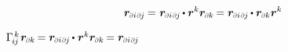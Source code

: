\begin{otherlanguage}{russian}
\vspace{1.2em}\begin{equation*}
\locationvector_{\differentialindex{i}\hspace{.2ex}\differentialindex{\hspace{-0.1ex}j}} \hspace{-0.1ex} = \hspace{.1ex}
\tikzmark{beginChristoffelSymbolOne} \locationvector_{\differentialindex{i}\hspace{.2ex}\differentialindex{\hspace{-0.1ex}j}} \hspace{-0.15ex} \dotp \tikzmark{beginEtensorUpDown} \locationvector^{k} \hspace{-0.4ex} \tikzmark{endChristoffelSymbolOne} \hspace{.4ex} \locationvector_\differentialindex{k} \tikzmark{endEtensorUpDown} \hspace{-0.2ex}
= \tikzmark{beginChristoffelSymbolOther} \locationvector_{\differentialindex{i}\hspace{.2ex}\differentialindex{\hspace{-0.1ex}j}} \hspace{-0.15ex} \dotp \tikzmark{beginEtensorDownUp} \locationvector_\differentialindex{k} \tikzmark{endChristoffelSymbolOther} \locationvector^k \tikzmark{endEtensorDownUp}
\end{equation*}%
%
%
%

${
\Gamma_{\hspace{-0.25ex}i\hspace{-0.1ex}j}^{\hspace{.25ex}k} \hspace{.2ex} \locationvector_\differentialindex{k} \hspace{-0.2ex} = \locationvector_{\differentialindex{i}\hspace{.2ex}\differentialindex{\hspace{-0.1ex}j}} \hspace{-0.16ex} \dotp \hspace{.1ex} \locationvector^k \locationvector_\differentialindex{k} \hspace{-0.2ex} = \locationvector_{\differentialindex{i}\hspace{.2ex}\differentialindex{\hspace{-0.1ex}j}}
}$


\end{otherlanguage}
